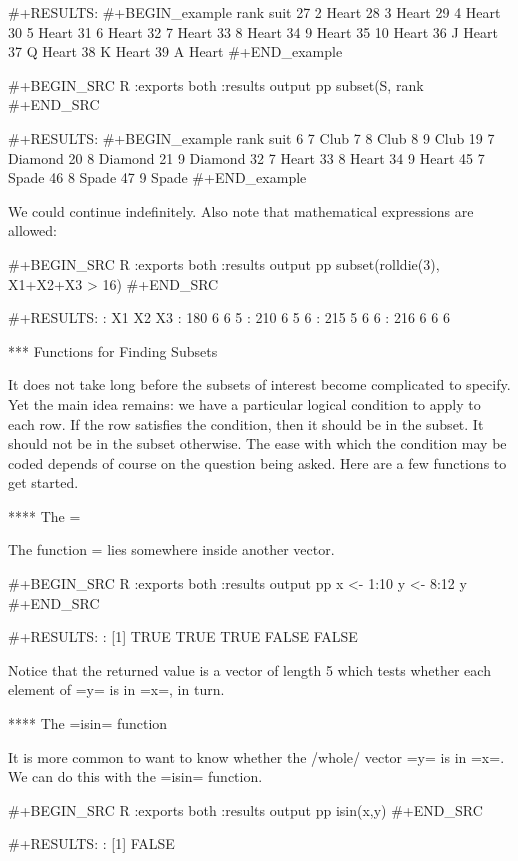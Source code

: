 #+RESULTS:
#+BEGIN_example
   rank  suit
27    2 Heart
28    3 Heart
29    4 Heart
30    5 Heart
31    6 Heart
32    7 Heart
33    8 Heart
34    9 Heart
35   10 Heart
36    J Heart
37    Q Heart
38    K Heart
39    A Heart
#+END_example

#+BEGIN_SRC R :exports both :results output pp  
subset(S, rank %
#+END_SRC

#+RESULTS:
#+BEGIN_example
   rank    suit
6     7    Club
7     8    Club
8     9    Club
19    7 Diamond
20    8 Diamond
21    9 Diamond
32    7   Heart
33    8   Heart
34    9   Heart
45    7   Spade
46    8   Spade
47    9   Spade
#+END_example

We could continue indefinitely. Also note that mathematical
expressions are allowed:

#+BEGIN_SRC R :exports both :results output pp   
subset(rolldie(3), X1+X2+X3 > 16) 
#+END_SRC

#+RESULTS:
:     X1 X2 X3
: 180  6  6  5
: 210  6  5  6
: 215  5  6  6
: 216  6  6  6

*** Functions for Finding Subsets

It does not take long before the subsets of interest become
complicated to specify. Yet the main idea remains: we have a
particular logical condition to apply to each row. If the row
satisfies the condition, then it should be in the subset. It should
not be in the subset otherwise. The ease with which the condition may
be coded depends of course on the question being asked. Here are a few
functions to get started.

**** The =%

The function =%
lies somewhere inside another vector.

#+BEGIN_SRC R :exports both :results output pp  
x <- 1:10 
y <- 8:12 
y %
#+END_SRC

#+RESULTS:
: [1]  TRUE  TRUE  TRUE FALSE FALSE

Notice that the returned value is a vector of length 5 which tests
whether each element of =y= is in =x=, in turn.

**** The =isin= function

It is more common to want to know whether the /whole/ vector =y= is in
=x=. We can do this with the =isin= function.

#+BEGIN_SRC R :exports both :results output pp   
isin(x,y) 
#+END_SRC

#+RESULTS:
: [1] FALSE

